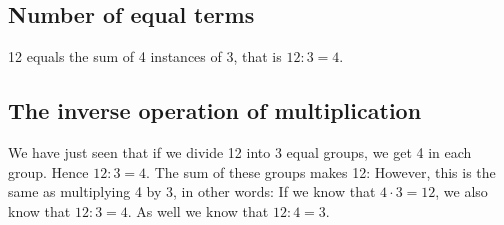 \subsection*{Number of equal terms}
12 equals the sum of 4 instances of 3, that is $ 12:3=4 $.


\subsection*{The inverse operation of multiplication}
We have just seen that if we divide 12 into 3 equal groups, we get 4 in each group. Hence $ 12:3=4$. The sum of these groups makes 12: 
However, this is the same as multiplying 4 by 3, in other words:
If we know that $ {4\cdot 3=12} $, we also know that $ {12:3=4} $. As well we know that $ {12:4=3} $. 






